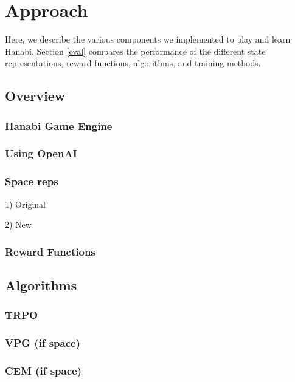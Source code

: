 \section{Approach}
\label{approach}

Here, we describe the various components we implemented to play and learn
Hanabi. Section \ref{eval} compares the performance of the different
state representations, reward functions, algorithms, and training
methods.

\subsection{Overview}

\subsubsection{Hanabi Game Engine}

\subsubsection{Using OpenAI}

\subsubsection{Space reps}

1) Original

2) New

\subsubsection{Reward Functions}

\subsection{Algorithms}

\subsubsection{TRPO}

\cite{TRPO}

\subsubsection{VPG (if space)}
\subsubsection{CEM (if space)}
